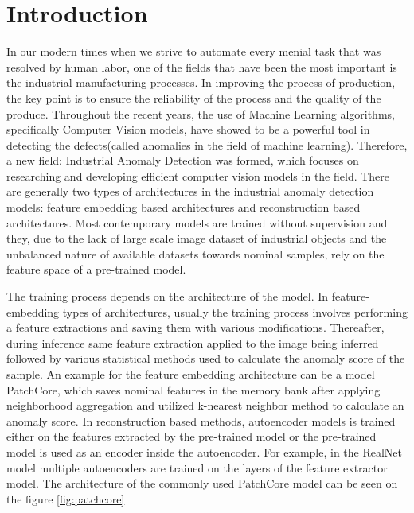 \chapter{Introduction}
\label{chapter:intro}

In our modern times when we strive to automate every menial task that was resolved by human labor, one of the fields that have been the most important is the industrial manufacturing processes. In improving the process of production, the key point is to ensure the reliability of the process and the quality of the produce. Throughout the recent years, the use of Machine Learning algorithms, specifically Computer Vision models, have showed to be a powerful tool in detecting the defects(called anomalies in the field of machine learning). Therefore, a new field: Industrial Anomaly Detection was formed, which focuses on researching and developing efficient computer vision models in the field. There are generally two types of architectures in the industrial anomaly detection models: feature embedding based architectures and reconstruction based architectures. Most contemporary models are trained without supervision and they, due to the lack of large scale image dataset of industrial objects and the unbalanced nature of available datasets towards nominal samples, rely on the feature space of a pre-trained model.

The training process depends on the architecture of the model. In feature-embedding types of architectures, usually the training process involves performing a feature extractions and saving them with various modifications. Thereafter, during inference same feature extraction applied to the image being inferred followed by various statistical methods used to calculate the anomaly score of the sample. An example for the feature embedding architecture can be a model PatchCore, which saves nominal features in the memory bank after applying neighborhood aggregation and utilized k-nearest neighbor method to calculate an anomaly score. In reconstruction based methods, autoencoder models is trained either on the features extracted by the pre-trained model or the pre-trained model is used as an encoder inside the autoencoder. For example, in the RealNet model multiple autoencoders are trained on the layers of the feature extractor model. The architecture of the commonly used PatchCore model can be seen on the figure \ref{fig:patchcore}

